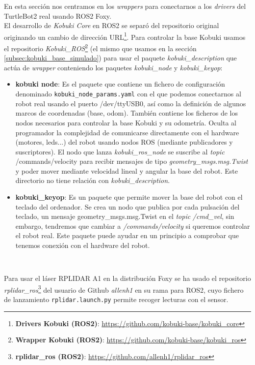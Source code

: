 En esta sección nos centramos en los \textit{wrappers} para conectarnos a los \textit{drivers} del TurtleBot2 real usando ROS2 Foxy.\\

El desarrollo de \textit{Kobuki Core} en ROS2 se separó del repositorio original originando un cambio de dirección URL\footnote{\textbf{Drivers Kobuki (ROS2)}: \url{https://github.com/kobuki-base/kobuki_core}}. Para controlar la base Kobuki usamos el repositorio \textit{Kobuki\_ROS}\footnote{\textbf{Wrapper Kobuki (ROS2)}: \url{https://github.com/kobuki-base/kobuki_ros}} (el mismo que usamos en la sección \ref{subsec:kobuki_base_simulado}) para usar el paquete \textit{kobuki\_description} que actúa de \textit{wrapper} conteniendo los paquetes \textit{kobuki\_node} y \textit{kobuki\_keyop}:\\

\begin{itemize}
	\item \textbf{kobuki node}: Es el paquete que contiene un fichero de configuración denominado \texttt{kobuki\_node\_params.yaml} con el que podemos conectarnos al robot real usando el puerto /dev/ttyUSB0, así como la definición de algunos marcos de coordenadas (base, odom). También contiene los ficheros de los nodos necesarios para controlar la base Kobuki y su odometría. Oculta al programador la complejidad de comunicarse directamente con el hardware (motores, leds...) del robot usando nodos ROS (mediante publicadores y suscriptores). El nodo que lanza \textit{kobuki\_ros\_node} se suscribe al \textit{topic} /commands/velocity para recibir mensajes de tipo \textit{geometry\_msgs.msg.Twist} y poder mover mediante velocidad lineal y angular la base del robot. Este directorio no tiene relación con \textit{kobuki\_description}.
	\item \textbf{kobuki\_keyop}: Es un paquete que permite mover la base del robot con el teclado del ordenador. Se crea un nodo que publica por cada pulsación del teclado, un mensaje geometry\_msgs.msg.Twist en el \textit{topic} \textit{/cmd\_vel}, sin embargo, tendremos que cambiar a \textit{/commands/velocity} si queremos controlar el robot real. Este paquete puede ayudar en un principio a comprobar que tenemos conexión con el hardware del robot.
\end{itemize}\

Para usar el láser RPLIDAR A1 en la distribución Foxy se ha usado el repositorio \textit{rplidar\_ros}\footnote{\textbf{rplidar\_ros (ROS2)}: \url{https://github.com/allenh1/rplidar_ros}} del usuario de Github \textit{allenh1} en su rama para ROS2, cuyo fichero de lanzamiento \texttt{rplidar.launch.py} permite recoger lecturas con el sensor.\\


